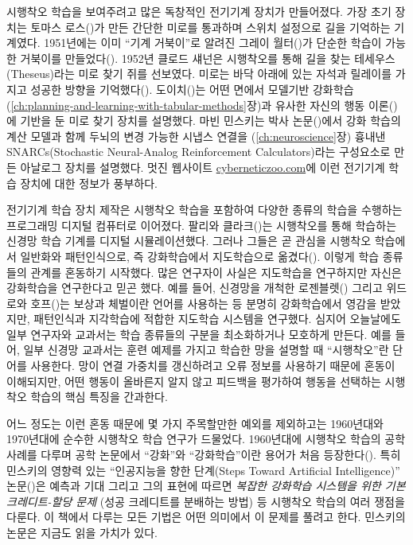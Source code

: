 시행착오 학습을 보여주려고 많은 독창적인 전기기계 장치가 만들어졌다. 가장 초기
장치는 토마스 로스(\cite{Ross1933})가 만든 간단한 미로를 통과하며 스위치
설정으로 길을 기억하는 기계였다. 1951년에는 이미 ``기계 거북이''로 알려진 그레이
월터(\cite{Walter1950})가 단순한 학습이 가능한 거북이를
만들었다(\cite{Walter1951}). 1952년 클로드 섀넌은 시행착오를 통해 길을 찾는
테세우스(Theseus)라는 미로 찾기 쥐를 선보였다. 미로는 바닥 아래에 있는 자석과
릴레이를 가지고 성공한 방향을 기억했다(\cite{Shannon1951, Shannon1952}).
도이치(\cite{Deutsch1954})는 어떤 면에서 모델기반
강화학습(\ref{ch:planning-and-learning-with-tabular-methods}장)과 유사한 자신의
행동 이론(\cite{Deutsch1953})에 기반을 둔 미로 찾기 장치를 설명했다. 마빈
민스키는 박사 논문(\cite{Minsky1954})에서 강화 학습의 계산 모델과 함께 두뇌의
변경 가능한 시냅스 연결을 (\ref{ch:neuroscience}장) 흉내낸 SNARCs(Stochastic
Neural-Analog Reinforcement Calculators)라는 구성요소로 만든 아날로그 장치를
설명했다. 멋진 웹사이트 \url{cyberneticzoo.com}에 이런 전기기계 학습 장치에
대한 정보가 풍부하다.

전기기계 학습 장치 제작은 시행착오 학습을 포함하여 다양한 종류의 학습을 수행하는
프로그래밍 디지털 컴퓨터로 이어졌다. 팔리와 클라크(\cite{FarleyClark1954})는
시행착오를 통해 학습하는 신경망 학습 기계를 디지털 시뮬레이션했다. 그러나 그들은
곧 관심을 시행착오 학습에서 일반화와 패턴인식으로, 즉 강화학습에서 지도학습으로
옮겼다(\cite{ClarkFarley1955}). 이렇게 학습 종류들의 관계를 혼동하기 시작했다.
많은 연구자이 사실은 지도학습을 연구하지만 자신은 강화학습을 연구한다고 믿곤
했다. 예를 들어, 신경망을 개척한 로젠블렛(\cite{Rosenblatt1962}) 그리고 위드로와
호프(\cite{WidrowHoff1960})는 보상과 체벌이란 언어를 사용하는 등 분명히
강화학습에서 영감을 받았지만, 패턴인식과 지각학습에 적합한 지도학습 시스템을
연구했다. 심지어 오늘날에도 일부 연구자와 교과서는 학습 종류들의 구분을
최소화하거나 모호하게 만든다. 예를 들어, 일부 신경망 교과서는 훈련 예제를 가지고
학습한 망을 설명할 때 ``시행착오''란 단어를 사용한다. 망이 연결 가중치를
갱신하려고 오류 정보를 사용하기 때문에 혼동이 이해되지만, 어떤 행동이 올바른지
알지 않고 피드백을 평가하여 행동을 선택하는 시행착오 학습의 핵심 특징을
간과한다.


어느 정도는 이런 혼동 때문에 몇 가지 주목할만한 예외를 제외하고는 1960년대와
1970년대에 순수한 시행착오 학습 연구가 드물었다. 1960년대에 시행착오 학습의
공학 사례를 다루며 공학 논문에서 ``강화''와 ``강화학습''이란 용어가 처음
등장한다(\cite[예,][]{WaltzFu1965, Mendel1966, Fu1970, MendelMcLaren1970}). 특히
민스키의 영향력 있는 ``인공지능을 향한 단계(Steps Toward Artificial
Intelligence)'' 논문(\cite{Minsky1961})은 예측과 기대 그리고 그의 표현에 따르면
\emph{복잡한 강화학습 시스템을 위한 기본 크레디트-할당 문제} (성공 크레디트를
분배하는 방법) 등 시행착오 학습의 여러 쟁점을 다룬다. 이 책에서 다루는 모든
기법은 어떤 의미에서 이 문제를 풀려고 한다. 민스키의 논문은 지금도 읽을 가치가
있다.

